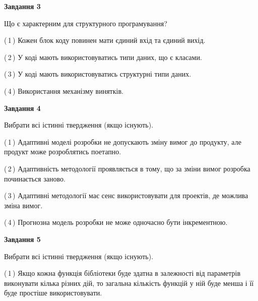 \documentclass[10pt, ukrainian]{article}
\begin{document}
{\begin {large}
{\begin {center}\textbf{Завдання 3}\end {center}}\par
Що є характерним для структурного програмування?\par
\vspace{2mm}



(\,1\,) Кожен блок коду повинен мати єдиний вхід та єдиний вихід.%



(\,2\,) У коді мають використовуватись типи даних, що є класами. %



(\,3\,) У коді мають використовуватись структурні типи даних. %



(\,4\,) Використання механізму винятків. %


{\begin {center}\textbf{Завдання 4}\end {center}}\par
Вибрати всі істинні твердження (якщо існують).\par
\vspace{2mm}



(\,1\,) Адаптивні моделі розробки не допускають зміну вимог до продукту, але продукт може розроблятись поетапно. %



(\,2\,) Адаптивність методології проявляється в тому, що за зміни вимог розробка починається заново. %



(\,3\,) Адаптивні методології має сенс використовувати для проектів, де можлива зміна вимог. %



(\,4\,) Прогнозна модель розробки не може одночасно бути інкрементною. %


{\begin {center}\textbf{Завдання 5}\end {center}}\par
Вибрати всі істинні твердження (якщо існують).\par
\vspace{2mm}



(\,1\,) Якщо кожна функція бібліотеки буде здатна в залежності від параметрів виконувати кілька різних дій, то загальна кількість функцій у ній буде менша і її буде простіше використовувати. %




\end{large}}
\end{document}
